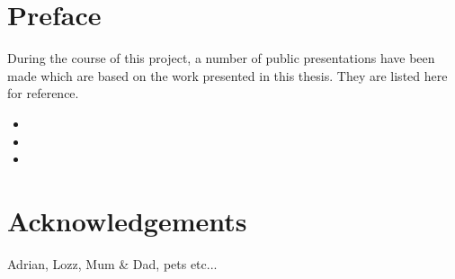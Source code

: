 \documentclass[a4paper,twoside,12pt,openany]{book}
\begin{document}
\chapter*{Preface} %
During the course of this project, a number of public presentations have been made which are based on the work
presented in this thesis. They are listed here for reference.
\nobibliography*
\begin{itemize}
\item {}
\item {}
\item {}
\end{itemize}


\chapter*{Acknowledgements} %

Adrian, Lozz, Mum \& Dad, pets etc...

\singlespace    %
\tableofcontents

\newpage
{}









\singlespace




\end{document}
